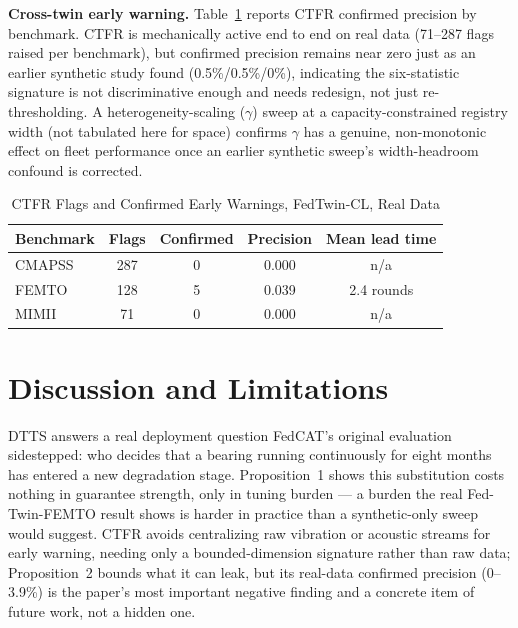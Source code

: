 \documentclass[journal]{IEEEtran}
\begin{document}
\textbf{Cross-twin early warning.} Table~\ref{tab:ctfr} reports CTFR confirmed precision by benchmark. CTFR is mechanically active end to end on real data (71--287 flags raised per benchmark), but confirmed precision remains near zero just as an earlier synthetic study found (0.5\%/0.5\%/0\%), indicating the six-statistic signature is not discriminative enough and needs redesign, not just re-thresholding. A heterogeneity-scaling ($\gamma$) sweep at a capacity-constrained registry width (not tabulated here for space) confirms $\gamma$ has a genuine, non-monotonic effect on fleet performance once an earlier synthetic sweep's width-headroom confound is corrected.

\begin{table}[H]
\centering
\caption{CTFR Flags and Confirmed Early Warnings, FedTwin-CL, Real Data}
\label{tab:ctfr}
\scriptsize
\setlength{\tabcolsep}{3pt}
\begin{tabular}{@{}lcccc@{}}
\toprule
Benchmark & Flags & Confirmed & Precision & Mean lead time \\
\midrule
CMAPSS & 287 & 0 & 0.000 & n/a \\
FEMTO & 128 & 5 & 0.039 & 2.4 rounds \\
MIMII & 71 & 0 & 0.000 & n/a \\
\bottomrule
\end{tabular}
\end{table}

\section{Discussion and Limitations}

DTTS answers a real deployment question FedCAT's original evaluation sidestepped: who decides that a bearing running continuously for eight months has entered a new degradation stage. Proposition~1 shows this substitution costs nothing in guarantee strength, only in tuning burden — a burden the real Fed-Twin-FEMTO result shows is harder in practice than a synthetic-only sweep would suggest. CTFR avoids centralizing raw vibration or acoustic streams for early warning, needing only a bounded-dimension signature rather than raw data; Proposition~2 bounds what it can leak, but its real-data confirmed precision (0--3.9\%) is the paper's most important negative finding and a concrete item of future work, not a hidden one.
\end{document}
